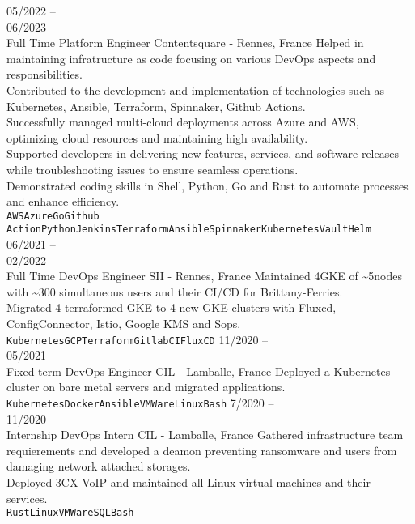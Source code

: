 \documentclass[10pt]{developercv} %
\begin{document}
\begin{entrylist}
	\entry
		{05/2022 --\\06/2023\\\footnotesize{Full Time}}
		{Platform Engineer}
		{Contentsquare - Rennes, France}
		{Helped in maintaining infratructure as code focusing on various DevOps aspects and responsibilities.\\
		Contributed to the development and implementation of technologies such as Kubernetes, Ansible, Terraform, Spinnaker, Github Actions.\\
		Successfully managed multi-cloud deployments across Azure and AWS, optimizing cloud resources and maintaining high availability.\\
		Supported developers in delivering new features, services, and software releases while troubleshooting issues to ensure seamless operations.\\
		Demonstrated coding skills in Shell, Python, Go and Rust to automate processes and enhance efficiency.\\
		\texttt{AWS}\slashsep\texttt{Azure}\slashsep\texttt{Go}\slashsep\texttt{Github Action}\slashsep\texttt{Python}\slashsep\texttt{Jenkins}\slashsep\texttt{Terraform}\slashsep\texttt{Ansible}\slashsep\texttt{Spinnaker}\slashsep\texttt{Kubernetes}\slashsep\texttt{Vault}\slashsep\texttt{Helm}}
	\entry
		{06/2021 --\\02/2022\\\footnotesize{Full Time}}
		{DevOps Engineer}
		{SII - Rennes, France}
		{Maintained 4GKE of \textasciitilde5nodes with \textasciitilde300 simultaneous users and their CI/CD for Brittany-Ferries.\\
Migrated 4 terraformed GKE to 4 new GKE clusters with Fluxcd, ConfigConnector, Istio, Google KMS and Sops.\\
		\texttt{Kubernetes}\slashsep\texttt{GCP}\slashsep\texttt{Terraform}\slashsep\texttt{GitlabCI}\slashsep\texttt{FluxCD}}
	\entry
		{11/2020 --\\05/2021\\\footnotesize{Fixed-term}}
		{DevOps Engineer}
		{CIL - Lamballe, France}
		{Deployed a Kubernetes cluster on bare metal servers and migrated applications.\\
		\texttt{Kubernetes}\slashsep\texttt{Docker}\slashsep\texttt{Ansible}\slashsep\texttt{VMWare}\slashsep\texttt{Linux}\slashsep\texttt{Bash}}
	\entry
		{7/2020 --\\11/2020\\\footnotesize{Internship}}
		{DevOps Intern}
		{CIL - Lamballe, France}
		{Gathered infrastructure team requierements and developed a deamon preventing ransomware and users from damaging network attached storages.\\
Deployed 3CX VoIP and maintained all Linux virtual machines and their services.\\
		\texttt{Rust}\slashsep\texttt{Linux}\slashsep\texttt{VMWare}\slashsep\texttt{SQL}\slashsep\texttt{Bash}}
\end{entrylist}
\end{document}
